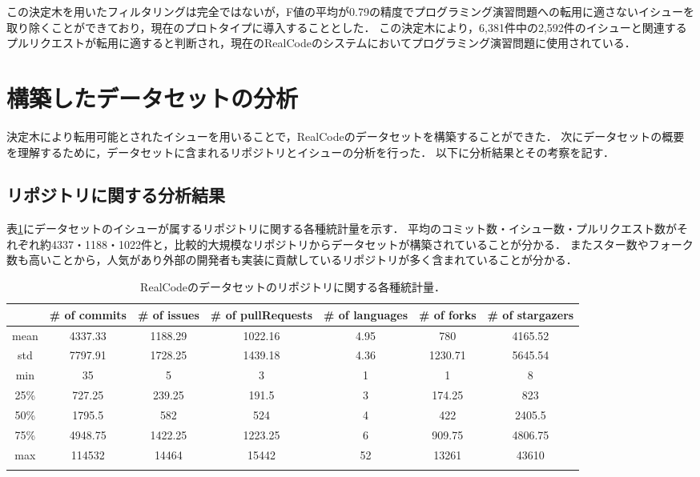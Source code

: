 この決定木を用いたフィルタリングは完全ではないが，F値の平均が0.79の精度でプログラミング演習問題への転用に適さないイシューを取り除くことができており，現在のプロトタイプに導入することとした．
この決定木により，6,381件中の2,592件のイシューと関連するプルリクエストが転用に適すると判断され，現在のRealCodeのシステムにおいてプログラミング演習問題に使用されている．



\section{構築したデータセットの分析}
決定木により転用可能とされたイシューを用いることで，RealCodeのデータセットを構築することができた．
次にデータセットの概要を理解するために，データセットに含まれるリポジトリとイシューの分析を行った．
以下に分析結果とその考察を記す．

\subsection{リポジトリに関する分析結果}

表\ref{table:stats_repos}にデータセットのイシューが属するリポジトリに関する各種統計量を示す．
平均のコミット数・イシュー数・プルリクエスト数がそれぞれ約4337・1188・1022件と，比較的大規模なリポジトリからデータセットが構築されていることが分かる．
またスター数やフォーク数も高いことから，人気があり外部の開発者も実装に貢献しているリポジトリが多く含まれていることが分かる．

\begin{table}[!b]
  \small
  \centering
  \caption{RealCodeのデータセットのリポジトリに関する各種統計量．}
  \label{table:stats_repos}
  \begin{tabular}{c || c | c | c | c | c | c} \Xhline{3\arrayrulewidth}
        & \# of commits & \# of issues & \# of pullRequests & \# of languages & \# of forks & \# of stargazers \\ \hline
        mean & 4337.33 & 1188.29 & 1022.16 & 4.95 & 780 & 4165.52 \\
        std & 7797.91 & 1728.25 & 1439.18 & 4.36 & 1230.71 & 5645.54 \\
        min & 35 & 5 & 3 & 1 & 1 & 8 \\
        25\% & 727.25 & 239.25 & 191.5 & 3 & 174.25 & 823 \\
        50\% & 1795.5 & 582 & 524 & 4 & 422 & 2405.5 \\
        75\% & 4948.75 & 1422.25 & 1223.25 & 6 & 909.75 & 4806.75 \\
        max & 114532 & 14464 & 15442 & 52 & 13261 & 43610 \\
    \Xhline{3\arrayrulewidth}
\end{tabular}
\end{table}

